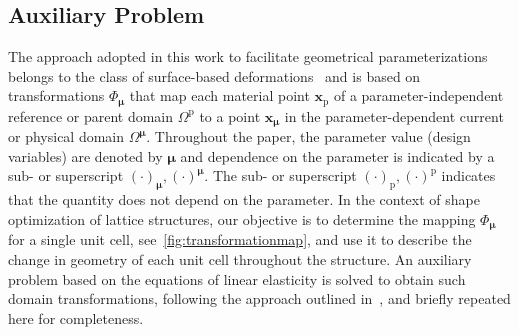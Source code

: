 \documentclass[a4paper]{eccomas_paper-2024}
\newcommand{\m}{\bm\mu}
\newcommand{\p}{\mathrm{p}}
\begin{document}
\subsection{Auxiliary Problem} %
\label{sub:Auxiliary Problem}
The approach adopted in this work to facilitate geometrical parameterizations belongs to the class of surface-based deformations~\cite{Botsch2010Polygon} and is based on transformations $\Phi_{\bm\mu}$ that map each material point $\bm{x}_{\mathrm{p}}$ of a parameter-independent reference or parent domain $\varOmega^{\mathrm{p}}$ to a point $\bm{x}_{\bm\mu}$ in the parameter-dependent current or physical domain $\varOmega^{\bm\mu}$.
Throughout the paper, the parameter value (design variables) are denoted by $\m$ and dependence on the parameter is indicated by a sub- or superscript $(\cdot)_{\m}, (\cdot)^{\m}$.
The sub- or superscript $(\cdot)_{\p}, (\cdot)^{\p}$ indicates that the quantity does not depend on the parameter.
In the context of shape optimization of lattice structures, our objective is to determine the mapping $\Phi_{\bm\mu}$ for a single unit cell, see~\cref{fig:transformationmap}, and use it to describe the change in geometry of each unit cell throughout the structure.
An auxiliary problem based on the equations of linear elasticity is solved to obtain such domain transformations, following the approach outlined in~\cite{Guo2022Learning}, and briefly repeated here for completeness.
\end{document}

